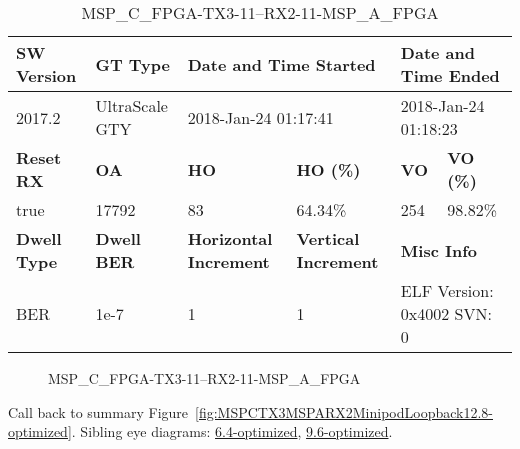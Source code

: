 \begin{table}[h]
\centering
\caption{MSP\_C\_FPGA-TX3-11--RX2-11-MSP\_A\_FPGA}
\label{tab:MSPCFPGATX311RX211MSPAFPGA12.8-optimized}
\begin{tabular}{@{}|l|l|l|l|l|l|@{}}
\toprule
\textbf{SW Version}                & \textbf{GT Type}   & \multicolumn{2}{l|}{\textbf{Date and Time Started}}            & \multicolumn{2}{l|}{\textbf{Date and Time Ended}}        \\ \midrule
2017.2                       & UltraScale GTY          & \multicolumn{2}{l|}{2018-Jan-24 01:17:41}                   & \multicolumn{2}{l|}{2018-Jan-24 01:18:23}               \\ \midrule
\textbf{Reset RX}                  & \textbf{OA} & \textbf{HO}   & \textbf{HO (\%)} & \textbf{VO} & \textbf{VO (\%)} \\ \midrule
true & 17792        & 83          & 64.34\%        & 254        & 98.82\%       \\ \midrule
\textbf{Dwell Type}                & \textbf{Dwell BER} & \textbf{Horizontal Increment} & \textbf{Vertical Increment}    & \multicolumn{2}{l|}{\textbf{Misc Info}}                  \\ \midrule
BER                            & 1e-7        & 1        & 1           & \multicolumn{2}{l|}{ELF Version: 0x4002 SVN: 0}                         \\ \bottomrule
\end{tabular}
\end{table}

\begin{figure}[h]
\caption{MSP\_C\_FPGA-TX3-11--RX2-11-MSP\_A\_FPGA} \label{fig:MSPCFPGATX311RX211MSPAFPGA12.8-optimized}
\end{figure}

Call back to summary Figure~\ref{fig:MSPCTX3MSPARX2MinipodLoopback12.8-optimized}.
Sibling eye diagrams: \hyperref[sec:MSPCFPGATX311RX211MSPAFPGA6.4-optimized]{6.4-optimized}, \hyperref[sec:MSPCFPGATX311RX211MSPAFPGA9.6-optimized]{9.6-optimized}.

\clearpage
\newpage

